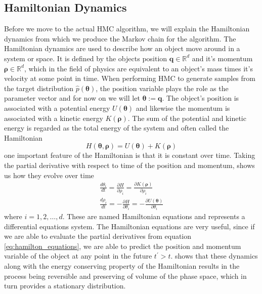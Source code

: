 \subsection{Hamiltonian Dynamics}
Before we move to the actual HMC algorithm, we will explain the Hamiltonian dynamics from which we produce the Markov chain for the algorithm. The Hamiltonian dynamics are used to describe how an object move around in a system or space. It is defined by the objects position $\boldsymbol{q}\in \mathbb{R}^d$ and it's momentum $\boldsymbol{\rho}\in \mathbb{R}^d$, which in the field of physics are equivalent to an object's mass times it's velocity at some point in time. When performing HMC to generate samples from the target distribution $\hat{p}(\boldsymbol{\theta})$, the position variable plays the role as the parameter vector and for now on we will let $\boldsymbol{\theta}:=\boldsymbol{q}$. The object's position is associated with a potential energy $U(\boldsymbol{\theta})$ and likewise the momentum is associated with a kinetic energy $K(\boldsymbol{\rho})$. The sum of the potential and kinetic energy is regarded as the total energy of the system and often called the Hamiltonian
\begin{equation*}
H(\boldsymbol{\theta},\boldsymbol{\rho})=U(\boldsymbol{\theta})+K(\boldsymbol{\rho})    
\end{equation*}       
one important feature of the Hamiltonian is that it is constant over time. Taking the partial derivative with respect to time of the position and momentum, shows us how they evolve over time
\begin{equation}\label{eq:hamilton_equations}
\begin{split}
\frac{d \theta_{i}}{d t}=\frac{\partial H}{\partial \rho_{i}}=\frac{\partial K(\boldsymbol{\rho})}{\partial \rho_{i}} \\
\frac{d \rho_{i}}{d t}=-\frac{\partial H}{\partial \theta_{i}}=-\frac{\partial U(\boldsymbol{\theta})}{\partial \theta_{i}}
\end{split}
\end{equation}
where $i=1,2, \ldots,d$. These are named Hamiltonian equations and represents a differential equations system. The Hamiltonian equations are very useful, since if we are able to evaluate the partial derivatives from equation \ref{eq:hamilton_equations}, we are able to predict the position and momentum variable of the object at any point in the future $t^\prime>t$. \cite{neal2012bayesian} shows that these dynamics along with the energy conserving property of the Hamiltonian results in the process being reversible and preserving of volume of the phase space, which in turn provides a stationary distribution. 


